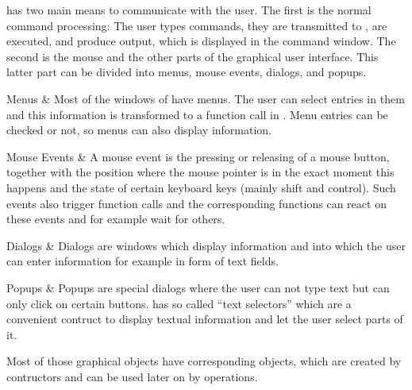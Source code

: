 
{\XGAP} has two main means to communicate with the user. The first is the
normal command processing: The user types commands, they are transmitted to 
{\GAP}, are executed, and produce output, which is displayed in the command
window. The second is the mouse and the other parts of the graphical user
interface. This latter part can be divided into menus, mouse events,
dialogs, and popups.

\beginitems
Menus & Most of the windows of {\XGAP} have menus. The user can select
entries in them and this information is transformed to a function call in
{\GAP}. Menu entries can be checked or not, so menus can also display
information. 

Mouse Events & A mouse event is the pressing or releasing of a mouse
button, together with the position where the mouse pointer is in the exact
moment this happens and the state of certain keyboard keys (mainly shift
and control). Such events also trigger {\GAP} function calls and the
corresponding functions can react on these events and for example wait for
others. 

Dialogs & Dialogs are windows which display information and into which
the user can enter information for example in form of text fields.

Popups & Popups are special dialogs where the user can not type text but
can only click on certain buttons. {\XGAP} has so called ``text selectors'' 
which are a convenient contruct to display textual information and let the
user select parts of it.
\enditems

Most of those graphical objects have corresponding {\GAP} objects, which
are created by contructors and can be used later on by operations.


